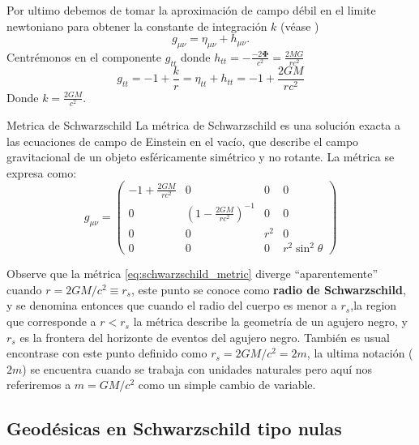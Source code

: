 Por ultimo debemos de tomar la aproximación de campo débil en el limite newtoniano para obtener la constante de integración \( k \) (véase \cite[148-149]{ryder-2009} )
\begin{equation}
    g_{\mu \nu} =  \eta_{\mu \nu}+ h_{\mu \nu} .
\end{equation}
Centrémonos en el componente \( g_{tt} \) donde \( h_{tt} = -\frac{-2 \mathbf{\Phi}}{c^2}  = \frac{2MG}{rc^2}\) 
\begin{equation}
    g_{tt} = -1 + \frac{k}{r} = \eta_{tt} + h_{tt} = -1 + \frac{2GM}{rc^2}
\end{equation}
Donde $k = \frac{2GM}{c^2}$.
\begin{definition}{Metrica de Schwarzschild}{}
La métrica de Schwarzschild es una solución exacta a las ecuaciones de campo de Einstein en el vacío, que describe el campo gravitacional de un objeto esféricamente simétrico y no rotante. La métrica se expresa como:
\begin{equation}
    g_{\mu \nu}=\left(\begin{array}{cccc}
                -1+\frac{2 G M}{r c^2} & 0                                       & 0   & 0                  \\
                0                      & \left(1-\frac{2 G M}{r c^2}\right)^{-1} & 0   & 0                  \\
                0                      & 0                                       & r^2 & 0                  \\
                0                      & 0                                       & 0   & r^2 \sin ^2 \theta
            \end{array}\right)
            \label{eq:schwarzschild_metric}
\end{equation}
\end{definition}
Observe que la métrica  \ref{eq:schwarzschild_metric} diverge ``aparentemente'' cuando \( r = 2GM/c^2 \equiv r_s\), este punto se conoce como \textbf{radio de Schwarzschild},  y se denomina entonces que cuando el radio del cuerpo es menor a  $r_s $,la region que corresponde a $r<r_s $ la métrica describe la geometría de un agujero negro, y $r_s$ es la  frontera del horizonte de eventos del agujero negro. También es usual encontrase con este punto definido como $r_s = 2GM/c^2 =2m $, la ultima notación ($2m$) se encuentra cuando se trabaja con unidades naturales pero aquí  nos referiremos a  $m = GM/c^2$ como un simple cambio de variable.  

\subsection{Geodésicas en Schwarzschild tipo  nulas}

